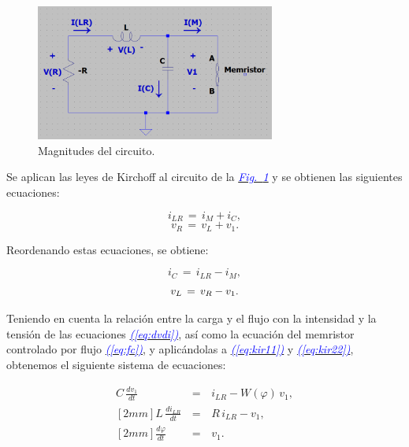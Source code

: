 \documentclass[12pt,a4paper]{report} %
\newcommand{\fref}[1]{\hyperref[#1]{\textcolor{blue}{\textit{Fig.~\ref*{#1}}}}}
\newcommand{\eref}[1]{\hyperref[#1]{\textcolor{blue}{\textit{(\ref*{#1})}}}}
\begin{document}
	\vspace{0.5cm}\begin{figure}[h]
		\centering
		\includegraphics[width=0.7\textwidth]{circuito.png}
		\caption{Magnitudes del circuito.}
		\label{fig:circuito}
	\end{figure}\smallskip
	
	\vspace{0.5cm}\noindent Se aplican las leyes de Kirchoff al circuito de la \fref{fig:circuito} y se obtienen las siguientes ecuaciones:
	
	\begin{equation}
		i_{LR}\,=\,i_M+i_C,
		\label{eq:kir1}
	\end{equation}\smallskip
	\begin{equation}
		v_R\,=\,v_L+v_1.
		\label{eq:kir2}
	\end{equation}\smallskip
	
		\vspace{0.5cm}\noindent Reordenando estas ecuaciones, se obtiene:
	
	\begin{equation}
		i_C\,=\,i_{LR}-i_M,
		\label{eq:kir11}
	\end{equation}\smallskip
	\begin{equation}\smallskip
		v_L\,=\,v_R-v_1.
		\label{eq:kir22}
	\end{equation}
	
	\newpage
	
	\noindent Teniendo en cuenta la relación entre la carga y el flujo con la intensidad y la tensión de las ecuaciones \eref{eq:dvdi}, así como la ecuación del memristor controlado por flujo \eref{eq:fc}, y aplicándolas a \eref{eq:kir11} y \eref{eq:kir22}, obtenemos el siguiente sistema de ecuaciones:
	
	\begin{eqnarray}
		C\,\frac{dv_1}{dt}\,&=&\,i_{LR}-W(\varphi)\,v_1 \label{eq:kir111}, \\ [2mm]
		L\,\frac{di_{LR}}{dt}\,&=&\,R\,i_{LR}-v_1 \label{eq:kir222}, \\ [2mm]
		\frac{d\varphi}{dt}\,&=&\,v_1. \label{eq:kir333}
	\end{eqnarray}\smallskip
	
\end{document}
